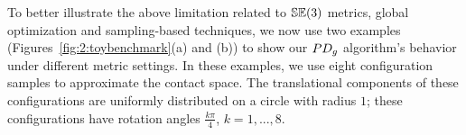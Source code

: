 To better illustrate the above limitation related to $\mathbb {SE}(3)$ metrics, global optimization and sampling-based techniques, we now use two examples (Figures~\ref{fig:2:toybenchmark}(a) and (b)) to show our $PD_g$ algorithm's behavior under different metric settings. In these examples, we use eight configuration samples to approximate the contact space. The translational components of these configurations are uniformly distributed on a circle with radius $1$; these configurations have rotation angles $\frac{k \pi}{4}$, $k=1,...,8$.

\begin{figure}[!h]
\centering
   \\

\end{figure}
